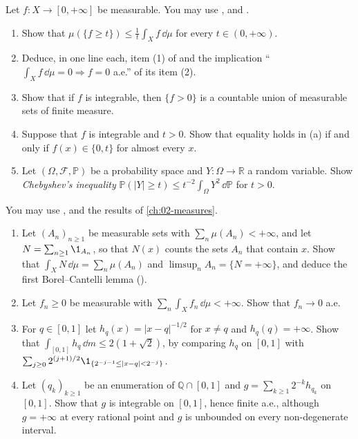 \begin{exercise}\label{ex:in-markov}
\easy Let $f:X\to[0,+\infty]$ be measurable. You may use ,
 and .
\begin{enumerate}[label=(\alph*)]
  \item Show that $\mu(\{f\ge t\})\le\frac1t\int_Xf\,\dd\mu$ for every $t\in(0,+\infty)$.
  \item Deduce, in one line each, item (1) of  and the implication
    ``$\int_Xf\,\dd\mu=0\Rightarrow f=0$ a.e.'' of its item (2).
  \item Show that if $f$ is integrable, then $\{f>0\}$ is a countable union of measurable sets
    of finite measure.
  \item Suppose that $f$ is integrable and $t>0$. Show that equality holds in (a) if and only if
    $f(x)\in\{0,t\}$ for almost every $x$.
  \item Let $(\Omega,\mathcal F,\mathbb P)$ be a probability space and $Y:\Omega\to\mathbb R$ a
    random variable. Show \emph{Chebyshev's inequality}
    $\mathbb P(|Y|\ge t)\le t^{-2}\int_\Omega Y^2\,\dd\mathbb P$ for $t>0$.
\end{enumerate}
\end{exercise}

\begin{exercise}\label{ex:in-series-uses}
\medium You may use ,  and the results of
\cref{ch:02-measures}.
\begin{enumerate}[label=(\alph*)]
  \item Let $(A_n)_{n\ge1}$ be measurable sets with $\sum_n\mu(A_n)<+\infty$, and let
    $N=\sum_{n\ge1}\1_{A_n}$, so that $N(x)$ counts the sets $A_n$ that contain $x$. Show that
    $\int_XN\,\dd\mu=\sum_n\mu(A_n)$ and $\limsup_nA_n=\{N=+\infty\}$, and deduce the first
    Borel--Cantelli lemma ().
  \item Let $f_n\ge0$ be measurable with $\sum_n\int_Xf_n\,\dd\mu<+\infty$. Show that $f_n\to0$
    a.e.
  \item For $q\in[0,1]$ let $h_q(x)=|x-q|^{-1/2}$ for $x\ne q$ and $h_q(q)=+\infty$. Show that
    $\int_{[0,1]}h_q\,\dd m\le2(1+\sqrt2)$, by comparing $h_q$ on $[0,1]$ with
    $\sum_{j\ge0}2^{(j+1)/2}\1_{\{2^{-j-1}\le|x-q|<2^{-j}\}}$.
  \item Let $(q_k)_{k\ge1}$ be an enumeration of $\mathbb Q\cap[0,1]$ and
    $g=\sum_{k\ge1}2^{-k}h_{q_k}$ on $[0,1]$. Show that $g$ is integrable on $[0,1]$, hence finite
    a.e., although $g=+\infty$ at every rational point and $g$ is unbounded on every
    non-degenerate interval.
\end{enumerate}
\end{exercise}

